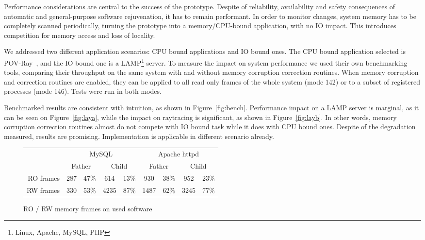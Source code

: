 Performance considerations are central to the success of the prototype.
Despite of reliability, availability and safety consequences of automatic and general-purpose software rejuvenation, it has to remain performant.
In order to monitor changes, system memory has to be completely scanned periodically, turning the prototype into a memory/CPU-bound application, with no IO impact.
This introduces competition for memory access and loss of locality.

\begin{figure*}[phtb]
\begin{center}
\caption{Performance impact on different applications}
\label{fig:bench}
\end{center}
\end{figure*}


We addressed two different application scenarios: CPU bound applications and IO bound ones.
The CPU bound application selected is POV-Ray~\cite{povray}, and the IO bound one is a LAMP\footnote{Linux, Apache, MySQL, PHP} server.
To measure the impact on system performance we used their own benchmarking tools, comparing their throughput on the same system with and without memory corruption correction routines.
When memory corruption and correction routines are enabled, they can be applied to all read only frames of the whole system (mode 142) or to a subset of registered processes (mode 146).
Tests were run in both modes.

Benchmarked results are consistent with intuition, as shown in Figure~\ref{fig:bench}.
Performance impact on a LAMP server is marginal, as it can be seen on Figure~\ref{fig:laya}, while the impact on raytracing is significant, as shown in Figure~\ref{fig:layb}.
In other words, memory corruption correction routines almost do not compete with IO bound task while it does with CPU bound ones.
Despite of the degradation measured, results are promising.
Implementation is applicable in different scenario already.

\begin{figure}[phtb]
\begin{center}
\begin{tabular}[t]{r||c|c|c|c|c|c|c|c|}
 & \multicolumn{4}{|c|}{MySQL} & \multicolumn{4}{|c|}{Apache httpd} \\
 & \multicolumn{2}{|c|}{Father} & \multicolumn{2}{|c|}{Child}  & \multicolumn{2}{|c|}{Father} & \multicolumn{2}{|c|}{Child}  \\
\hline
\hline
RO frames & 287 & 47\% & 614 & 13\% & 930 & 38\%  & 952 & 23\% \\
\hline
RW frames & 330 & 53\% & 4235 & 87\% & 1487 & 62\%  & 3245 & 77\% \\
\hline
\end{tabular}
\caption{RO / RW memory frames on used software}
\label{table:rovsrw}
\end{center}
\end{figure}


